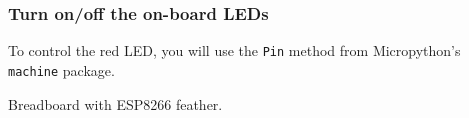 \subsubsection{\howto Turn on/off the on-board LEDs}
To control the red LED, you will use the \lstinline{Pin} method from Micropython’s \lstinline{machine} package.
\begin{marginfigure}[-2cm]
	\caption[ESP8266 feather microcontroller on breadboard]{Breadboard with ESP8266 feather.}
\end{marginfigure}

